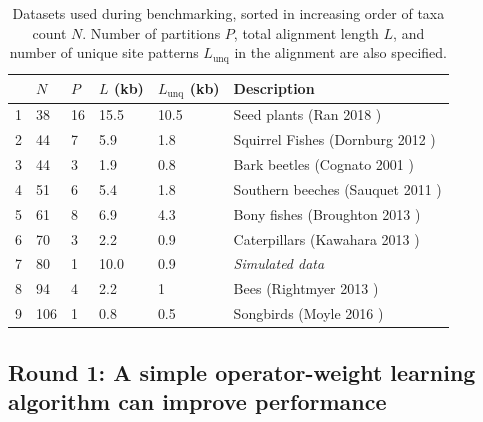 \documentclass[10pt,letterpaper]{article}
\begin{document}
\begin{table}[h!]
\centering
\begin{tabular}{|l| l l l l l|} 
 \hline
  & $N$ & $P$ & $L$ (kb) & $L_\text{unq}$ (kb) & \textbf{Description} \\
  \hline
 
 
 1  &  38  &  16  &  15.5  &  10.5  &  Seed plants (Ran 2018 \cite{Ran_2018}) \\ 

2  &  44  &  7  &  5.9  &  1.8  &  Squirrel Fishes (Dornburg 2012 \cite{Dornburg_2012}) \\ 

3  &  44  &  3  &  1.9  &  0.8  &  Bark beetles (Cognato 2001 \cite{Cognato_2001}) \\ 

4  &  51  &  6  &  5.4  &  1.8  &  Southern beeches (Sauquet 2011 \cite{Sauquet_2011}) \\ 

5  &  61  &  8  &  6.9  &  4.3  &  Bony fishes (Broughton 2013 \cite{Broughton_2013}) \\ 

6  &  70  &  3  &  2.2  &  0.9  &  Caterpillars (Kawahara 2013 \cite{Kawahara_2013}) \\ 

7  &  80  &  1 &  10.0  &  0.9  &  \textit{Simulated data}  \\ 

8  &  94  &  4  &  2.2  &  1  &  Bees (Rightmyer 2013 \cite{Rightmyer_2013}) \\ 

9  &  106  &  1  &  0.8  &  0.5  &  Songbirds (Moyle 2016 \cite{Moyle_2016}) \\ 





 \hline
\end{tabular}
\caption{Datasets used during benchmarking, sorted in increasing order of taxa count $N$. Number of partitions $P$, total alignment length $L$, and number of unique site patterns $L_\text{unq}$ in the alignment are also specified.
}
\label{table:datasets}
\end{table}


\clearpage
\subsection*{Round 1: A simple operator-weight learning algorithm can improve performance}
\end{document}
